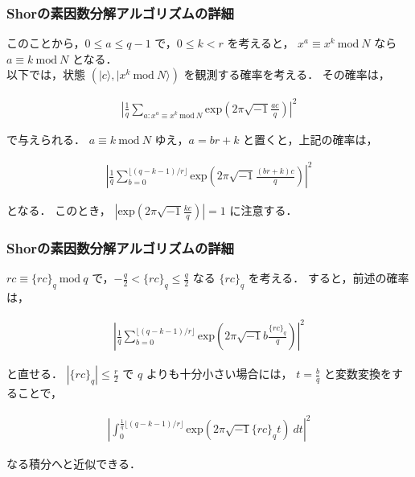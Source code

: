 \documentclass[dvipdfmx,12pt]{beamer}
\begin{document}
\begin{frame}

\frametitle{Shorの素因数分解アルゴリズムの詳細}

このことから，$ 0 \leq a \leq q - 1 $ で，$ 0 \leq k < r $ を考えると，
$ x^a \equiv x^k \ \mathrm{mod} \ N $ なら $ a \equiv k \ \mathrm{mod} \ N $ となる．\\
以下では，状態 $ ( | c \rangle, | x^k \ \mathrm{mod} \ N \rangle ) $ を観測する確率を考える．
その確率は， \vspace{-25pt}

\begin{align*}
    \displaystyle \left| \frac{1}{q} \sum_{a : x^a \equiv x^k \ \mathrm{mod} \ N} \mathrm{exp} \left( 2 \pi \sqrt{-1} \frac{ac}{q} \right) \right|^2
\end{align*}

で与えられる．
$ a \equiv k \ \mathrm{mod} \ N $ ゆえ，$ a = br + k $ と置くと，上記の確率は， \vspace{-25pt}

\begin{align*}
    \displaystyle \left| \frac{1}{q} \sum_{b = 0}^{\lfloor (q - k - 1)/r \rfloor} \mathrm{exp} \left( 2 \pi \sqrt{-1} \frac{(br + k)c}{q} \right) \right|^2
\end{align*}

となる．
このとき， $ \left| \mathrm{exp} \left( 2 \pi \sqrt{-1} \frac{kc}{q} \right) \right| = 1 $ に注意する．

\end{frame}


\begin{frame}

\frametitle{Shorの素因数分解アルゴリズムの詳細}

$ rc \equiv \{ rc \}_q \ \mathrm{mod} \ q $ で，$ - \frac{q}{2} < \{ rc \}_q \leq \frac{q}{2} $ なる $ \{ rc \}_q $ を考える．
すると，前述の確率は，\vspace{-25pt}

\begin{align*}
    \displaystyle \left| \frac{1}{q} \sum_{b = 0}^{\lfloor (q - k - 1)/r \rfloor} \mathrm{exp} \left( 2 \pi \sqrt{-1} b \frac{\{ rc \}_q}{q} \right) \right|^2
\end{align*}

と直せる．
$ | \{ rc \}_q | \leq \frac{r}{2} $ で $q$ よりも十分小さい場合には，
$ t = \frac{b}{q} $ と変数変換をすることで，\vspace{-25pt}

\begin{align*}
    \displaystyle \left| \int_{0}^{\frac{1}{q} \lfloor (q - k - 1)/r \rfloor} \mathrm{exp} \left( 2 \pi \sqrt{-1} \{ rc \}_q t \right) \ dt \right|^2
\end{align*}

なる積分へと近似できる．
    
\end{frame}
\end{document}

